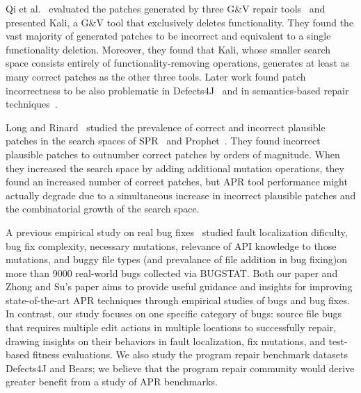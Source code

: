 \documentclass[sigconf, timestamp-false, anonymous=true]{acmart}
\begin{document}
Qi et al.~\cite{patch-correctness} evaluated the patches generated 
by three G\&V repair tools~\cite{genprog, ae, rsrepair} and presented 
Kali, a G\&V tool that exclusively deletes functionality. They found the 
vast majority of generated patches to be incorrect and equivalent to 
a single functionality deletion. Moreover, they found that Kali, whose 
smaller search space consists entirely of functionality-removing 
operations, generates at least as many correct patches as the 
other three tools. Later work found patch incorrectness to be 
also problematic in Defects4J~\cite{d4j-eval} and in semantics-based 
repair techniques~\cite{Le2018}.

Long and Rinard~\cite{long-search-spaces} studied the prevalence of 
correct and incorrect plausible patches in the search spaces of SPR~\cite{spr} 
and Prophet~\cite{prophet}. They found incorrect plausible patches to outnumber 
correct patches by orders of magnitude. When they increased the search space 
by adding additional mutation operations, they found an increased number of 
correct patches, but APR tool performance might actually degrade due to a 
simultaneous increase in incorrect plausible patches and the combinatorial 
growth of the search space.

A previous empirical study on real bug fixes~\cite{zhong2015} 
studied fault localization dificulty, bug fix complexity, necessary
mutations, relevance of API knowledge to those mutations, and buggy file types
(and prevalance of file addition in bug fixing)on more than 9000 real-world bugs
collected via BUGSTAT.  
Both our paper and Zhong and Su's paper aims to provide useful guidance and insights for 
improving state-of-the-art APR techniques through empirical studies of bugs and bug fixes. 
In contrast, our study focuses on one specific category of bugs: 
source file bugs that requires multiple edit actions in multiple locations to successfully repair, 
drawing insights on their behaviors in fault localization, fix mutations, and test-based 
fitness evaluations. We also study the program repair benchmark datasets Defects4J 
and Bears; we believe that the program repair community would derive greater 
benefit from a study of APR benchmarks.
\end{document}
